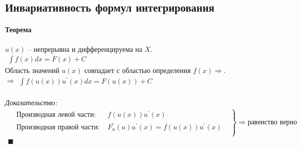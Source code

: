 \documentclass[12pt, fleqn]{book}
\begin{document}
	\subsection{Инвариативность формул интегрирования}
	\paragraph{Теорема}
	$u(x)$ -- непрерывна и дифференцируема на $X$. \\$\begin{gathered}
		\int f(x)dx=F(x)+C
	\end{gathered}$\\
	Область значений $u(x)$ совпадает с областью определения $f(x) \Rightarrow$.\\
	$\Rightarrow\begin{gathered}
		\int f\left(u\left(x\right)\right)u^\prime\left(x\right)dx=F\left(u\left(x\right)\right)+C
	\end{gathered}$\\\\
	\textit{Доказательство:}\\
	\begin{multline*}
		\left.
		\begin{aligned}
			&\text{Производная левой части: }& f\left(u\left(x\right)\right)u^\prime\left(x\right)&\\
			&\text{Производная правой части: }& F_u^\prime\left(u\right)u^\prime\left(x\right)=f\left(u\left(x\right)\right)u^\prime\left(x\right)&\\
		\end{aligned}
		\right\} \Rightarrow \text{равенство верно}\\
		\blacksquare\\
	\end{multline*}
\end{document}
